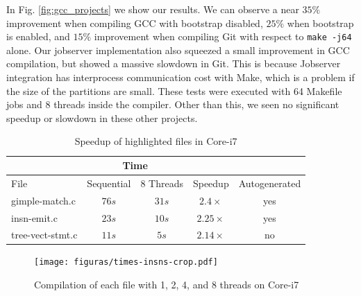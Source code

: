 \documentclass[runningheads]{llncs}
\begin{document}
In Fig. \ref{fig:gcc_projects} we show our results. We can observe a near
$35\%$ improvement when compiling GCC with bootstrap disabled, $25\%$ when
bootstrap is enabled, and $15\%$ improvement when compiling Git with respect to
\texttt{make -j64} alone. Our jobserver implementation also squeezed a small
improvement in GCC compilation, but showed a massive slowdown in Git. This is
because Jobserver integration has interprocess communication cost
with Make, which is a problem if the size of the partitions are small.  These
tests were executed with 64 Makefile jobs and 8 threads inside the compiler.
Other than this, we seen no significant speedup or slowdown in these other
projects.

\begin{table}[]
\centering
\begin{tabular}{l|c|c|cc}
\cline{2-3}
                                       & \multicolumn{2}{c|}{Time} & \multicolumn{1}{l}{}         & \multicolumn{1}{l}{}               \\ \hline
\multicolumn{1}{|l|}{File}             & Sequential   & 8 Threads  & \multicolumn{1}{c|}{Speedup} & \multicolumn{1}{c|}{Autogenerated} \\ \hline
\multicolumn{1}{|l|}{gimple-match.c}   & $76s$          & $31s$        & \multicolumn{1}{c|}{$2.4\times$}     & \multicolumn{1}{c|}{yes}           \\ \hline
\multicolumn{1}{|l|}{insn-emit.c}      & $23s$          & $10s$        & \multicolumn{1}{c|}{$2.25\times$}    & \multicolumn{1}{c|}{yes}           \\ \hline
\multicolumn{1}{|l|}{tree-vect-stmt.c} & $11s$          & $5s$         & \multicolumn{1}{c|}{$2.14\times$}    & \multicolumn{1}{c|}{no}            \\ \hline
\end{tabular}
\caption{Speedup of highlighted files in Core-i7}
\label{table:files}
\end{table}

\vspace*{-1.0cm}

\begin{figure}
\centering
	 \texttt{[image: figuras/times-insns-crop.pdf]}
	  \caption{Compilation of each file with 1, 2, 4, and 8 threads on
	  Core-i7}
	  \label{fig:gcc_all_files}
\end{figure}

\vspace*{-1.0cm}
\end{document}

